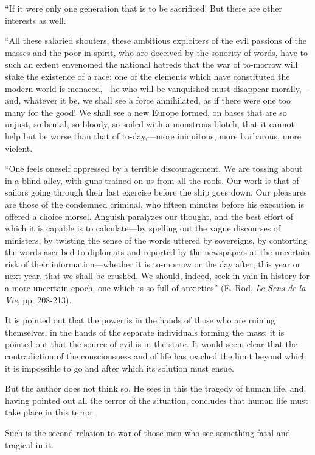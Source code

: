 \documentclass{book}
\begin{document}
“If it were only one generation that is to be sacrificed! But there are other interests as well.

“All these salaried shouters, these ambitious exploiters of the evil passions of the masses and the poor in spirit, who are deceived by the sonority of words, have to such an extent envenomed the national hatreds that the war of to-morrow will stake the existence of a race: one of the elements which have constituted the modern world is menaced,—he who will be vanquished must disappear morally,—and, whatever it be, we shall see a force annihilated, as if there were one too many for the good! We shall see a new Europe formed, on bases that are so unjust, so brutal, so bloody, so soiled with a monstrous blotch, that it cannot help but be worse than that of to-day,—more iniquitous, more barbarous, more violent.

“One feels oneself oppressed by a terrible discouragement. We are tossing about in a blind alley, with guns trained on us from all the roofs. Our work is that of sailors going through their last exercise before the ship goes down. Our pleasures are those of the condemned criminal, who fifteen minutes before his execution is offered a choice morsel. Anguish paralyzes our thought, and the best effort of which it is capable is to calculate—by spelling out the vague discourses of ministers, by twisting the sense of the words uttered by sovereigns, by contorting the words ascribed to diplomats and reported by the newspapers at the uncertain risk of their information—whether it is to-morrow or the day after, this year or next year, that we shall be crushed. We should, indeed, seek in vain in history for a more uncertain epoch, one which is so full of anxieties” (E. Rod, \emph{Le Sens de la Vie}, pp. 208-213).

It is pointed out that the power is in the hands of those who are ruining themselves, in the hands of the separate individuals forming the mass; it is pointed out that the source of evil is in the state. It would seem clear that the contradiction of the consciousness and of life has reached the limit beyond which it is impossible to go and after which its solution must ensue.

But the author does not think so. He sees in this the tragedy of human life, and, having pointed out all the terror of the situation, concludes that human life must take place in this terror.

Such is the second relation to war of those men who see something fatal and tragical in it.
\end{document}
